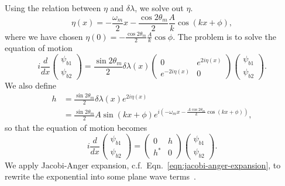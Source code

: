 Using the relation between $\eta$ and $\delta\lambda$, we solve out $\eta$.
\begin{equation}
   \eta(x) = - \frac{\omega_m}{2}x - \frac{\cos 2\theta_m}{2} \frac{A}{k} \cos (k x + \phi), 
\end{equation}
where we have chosen $\eta(0)=-\frac{\cos 2\theta_m}{2}\frac{A}{k}\cos\phi$.
The problem is to solve the equation of motion
\begin{equation}
   i \frac{d}{dx} \begin{pmatrix} \psi_{b1} \\ \psi_{b2} \end{pmatrix} = \frac{\sin 2\theta_m}{2}\delta\lambda(x) \begin{pmatrix} 0 &  e^{2i\eta(x)} \\   e^{-2i\eta(x)} &  0 \end{pmatrix}  \begin{pmatrix} \psi_{b1} \\ \psi_{b2} \end{pmatrix} . 
\end{equation}
We also define
\begin{align}
   h &= \frac{\sin 2\theta_m}{2}\delta\lambda(x)  e^{2i\eta(x)} \\
   & = \frac{\sin 2\theta_m}{2} A \sin (kx+\phi) e^{i\left( -\omega_m x - \frac{A \cos 2\theta_m}{k} \cos (kx+\phi) \right)},
   \label{chap:matter-sec:deep-jacobi-subsec:single-matter-freq-eqn:single-frequency-hamiltonian-element}
\end{align}
so that the equation of motion becomes
\begin{equation}
   i \frac{d}{dx} \begin{pmatrix} \psi_{b1} \\ \psi_{b2} \end{pmatrix} =  \begin{pmatrix} 0 &  h \\   h^* &  0 \end{pmatrix}  \begin{pmatrix} \psi_{b1} \\ \psi_{b2} \end{pmatrix} . 
\end{equation}
We apply Jacobi-Anger expansion, c.f.~Eqn.~\ref{eqn:jacobi-anger-expansion}, to rewrite the exponential into some plane wave terms~\cite{Patton2014}.

